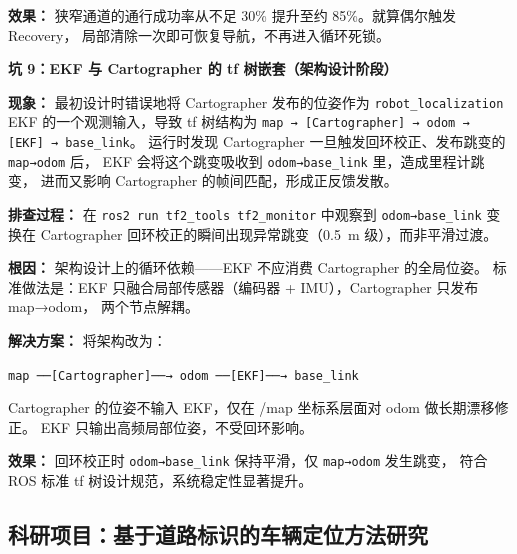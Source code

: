 \documentclass[11pt,a4paper]{article}
\begin{document}
\textbf{效果：}
狭窄通道的通行成功率从不足 30\% 提升至约 85\%。就算偶尔触发 Recovery，
局部清除一次即可恢复导航，不再进入循环死锁。

\vspace{2em}

\textbf{坑 9：EKF 与 Cartographer 的 tf 树嵌套（架构设计阶段）}

\textbf{现象：}
最初设计时错误地将 Cartographer 发布的位姿作为 \texttt{robot\_localization}
EKF 的一个观测输入，导致 tf 树结构为
\texttt{map → [Cartographer] → odom → [EKF] → base\_link}。
运行时发现 Cartographer 一旦触发回环校正、发布跳变的 \texttt{map→odom} 后，
EKF 会将这个跳变吸收到 \texttt{odom→base\_link} 里，造成里程计跳变，
进而又影响 Cartographer 的帧间匹配，形成正反馈发散。

\textbf{排查过程：}
在 \texttt{ros2 run tf2\_tools tf2\_monitor} 中观察到 \texttt{odom→base\_link}
变换在 Cartographer 回环校正的瞬间出现异常跳变（0.5~m 级），而非平滑过渡。

\textbf{根因：}
架构设计上的循环依赖——EKF 不应消费 Cartographer 的全局位姿。
标准做法是：EKF 只融合局部传感器（编码器 + IMU），Cartographer 只发布 map→odom，
两个节点解耦。

\textbf{解决方案：}
将架构改为：
\begin{center}
\texttt{map ──[Cartographer]──→ odom ──[EKF]──→ base\_link}
\end{center}
Cartographer 的位姿不输入 EKF，仅在 /map 坐标系层面对 odom 做长期漂移修正。
EKF 只输出高频局部位姿，不受回环影响。

\textbf{效果：}
回环校正时 \texttt{odom→base\_link} 保持平滑，仅 \texttt{map→odom} 发生跳变，
符合 ROS 标准 tf 树设计规范，系统稳定性显著提升。

\subsection*{科研项目：基于道路标识的车辆定位方法研究}

\end{document}
